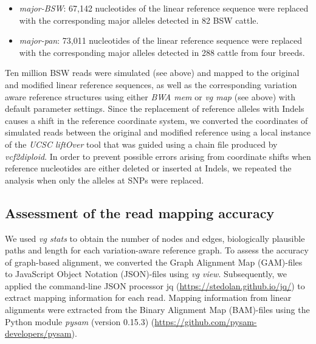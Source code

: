 \documentclass[../main.tex]{subfiles}
\begin{document}
\begin{itemize}
    \item \emph{major-BSW}: 67,142 nucleotides of the linear reference sequence were replaced with the corresponding major alleles detected in 82 BSW cattle.
    \item \emph{major-pan}: 73,011 nucleotides of the linear reference sequence were replaced with the corresponding major alleles detected in 288 cattle from four breeds.
\end{itemize}

Ten million BSW reads were simulated (see above) and mapped to the original and modified linear reference sequences, as well as the corresponding variation aware reference structures using either \emph{BWA mem} or \emph{vg map} (see above) with default parameter settings. Since the replacement of reference alleles with Indels causes a shift in the reference coordinate system, we converted the coordinates of simulated reads between the original and modified reference using a local instance of the \emph{UCSC liftOver} tool \citep{haeussler2019ucsc} that was guided using a chain file produced by \emph{vcf2diploid}. In order to prevent possible errors arising from coordinate shifts when reference nucleotides are either deleted or inserted at Indels, we repeated the analysis when only the alleles at SNPs were replaced.

\subsection*{Assessment of the read mapping accuracy}

We used \emph{vg stats} to obtain the number of nodes and edges, biologically plausible paths and length for each variation-aware reference graph. To assess the accuracy of graph-based alignment, we converted the Graph Alignment Map (GAM)-files to JavaScript Object Notation (JSON)-files using \emph{vg view}. Subsequently, we applied the command-line JSON processor jq (\url{https://stedolan.github.io/jq/}) to extract mapping information for each read. Mapping information from linear alignments were extracted from the Binary Alignment Map (BAM)-files using the Python module \emph{pysam} (version 0.15.3) (\url{https://github.com/pysam-developers/pysam}).
\end{document}
